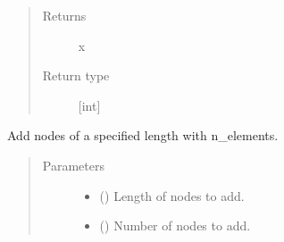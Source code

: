 \documentclass[letterpaper,10pt,english]{sphinxmanual}
\begin{document}
\begin{fulllineitems}
\begin{fulllineitems}
\begin{quote}
\begin{description}
\item[{Returns}] \leavevmode
\sphinxAtStartPar
x

\item[{Return type}] \leavevmode
\sphinxAtStartPar
{[}int{]}

\end{description}\end{quote}

\end{fulllineitems}


\begin{fulllineitems}
\label{\detokenize{mesh:mesh.Mesh1D.add_nodes}}
\sphinxAtStartPar
Add nodes of a specified length with n\_elements.
\begin{quote}\begin{description}
\item[{Parameters}] \leavevmode\begin{itemize}
\item {} 
\sphinxAtStartPar
{} (\sphinxstyleliteralemphasis{\sphinxupquote{{[}}}\sphinxstyleliteralemphasis{\sphinxupquote{{]}}}) \textendash{} Length of nodes to add.

\item {} 
\sphinxAtStartPar
{} (\sphinxstyleliteralemphasis{\sphinxupquote{{[}}}\sphinxstyleliteralemphasis{\sphinxupquote{{]}}}) \textendash{} Number of nodes to add.

\end{itemize}

\end{description}\end{quote}

\end{fulllineitems}


\end{fulllineitems}

\end{document}
